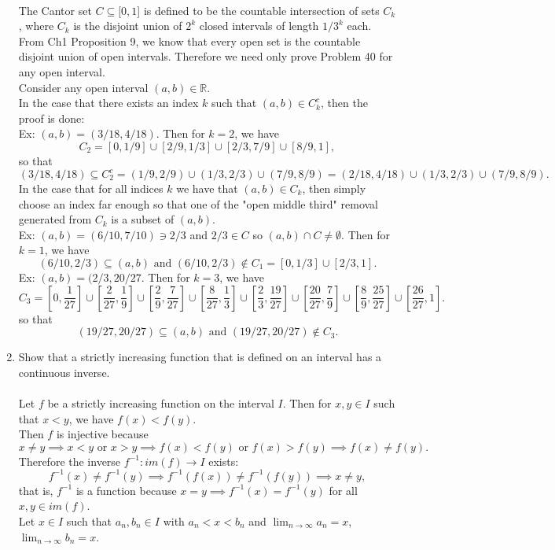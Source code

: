 \begin{enumerate}
	\\The Cantor set $C\subseteq[0,1$] is defined to be the countable intersection of sets $C_k$, where $C_k$ is the disjoint union of $2^k$ closed intervals of length $1/3^k$ each.
	From Ch1 Proposition 9, we know that every open set is the countable disjoint union of open intervals. 
	Therefore we need only prove Problem 40 for any open interval.
	\\Consider any open interval $(a,b)\in\mathbb{R}$. 
	\\In the case that there exists an index $k$ such that $(a,b)\in C_k^c$, then the proof is done:
	\\Ex: $(a,b)=(3/18,4/18)$. Then for $k=2$, we have 
	\[
		C_2=[0,1/9]\cup[2/9,1/3]\cup[2/3,7/9]\cup[8/9,1],	
	\]
	so that
	\[
		(3/18,4/18)\subseteq C_2^c=(1/9,2/9)\cup(1/3,2/3)\cup(7/9,8/9)=(2/18,4/18)\cup(1/3,2/3)\cup(7/9,8/9).	
	\] 
	In the case that for all indices $k$ we have that $(a,b)\in C_k$, then simply choose an index far enough so that one of the "open middle third" removal generated from $C_k$ is a subset of $(a,b)$.
	\\Ex: $(a,b)=(6/10,7/10)\ni 2/3$ and $2/3\in C$ so $(a,b)\cap C\neq\emptyset$. Then for $k=1$, we have
	\[
		(6/10,2/3)\subseteq(a,b)\text{ and } (6/10,2/3)\notin C_1=[0,1/3]\cup[2/3,1].
	\]
	Ex: $(a,b)=(2/3,20/27$. Then for $k=3$, we have
	\[
		C_3=[0,\frac{1}{27}]\cup[\frac{2}{27},\frac{1}{9}]\cup[\frac{2}{9},\frac{7}{27}]\cup[\frac{8}{27},\frac{1}{3}]\cup[\frac{2}{3},\frac{19}{27}]\cup[\frac{20}{27},\frac{7}{9}]\cup[\frac{8}{9},\frac{25}{27}]\cup[\frac{26}{27},1].
	\]
	so that
	\[
		(19/27,20/27)\subseteq(a,b)\text{ and } (19/27,20/27)\notin C_3.
	\]
	\item Show that a strictly increasing function that is defined on an interval has a continuous inverse.\\
	\\Let $f$ be a strictly increasing function on the interval $I$. Then for $x,y\in I$ such that $x<y$, we have $f(x)<f(y)$.
	\\Then $f$ is injective because 
	\[
		x\neq y\implies x<y\text{ or }x>y\implies f(x)<f(y)\text{ or }f(x)>f(y)\implies f(x)\neq f(y).
	\]
	Therefore the inverse $f^{-1}:im(f)\to I$ exists:
	\[
		f^{-1}(x)\neq f^{-1}(y)\implies f^{-1}(f(x))\neq f^{-1}(f(y))\implies x\neq y,
	\]
	that is, $f^{-1}$ is a function because $x=y\implies f^{-1}(x)= f^{-1}(y)$ for all $x,y\in im(f)$.\\
	Let $x\in I$ such that $a_n,b_n\in I$ with $a_n < x < b_n$ and $\lim_{n\to\infty}a_n=x$, $\lim_{n\to\infty}b_n=x$. 

\end{enumerate}
